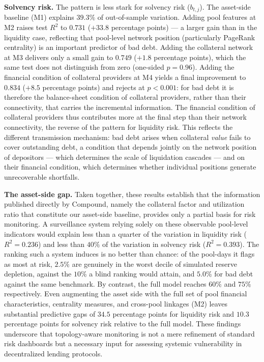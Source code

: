 \documentclass[a4paper,UKenglish,cleveref, autoref, thm-restate]{informs3}
\newcommand{\rev}[1]{{\color{purple}#1}}
\DeclareRobustCommand{\latestrev}[1]{{\color{red}\hypersetup{linkcolor=red,citecolor=red,urlcolor=red}#1}}
\newcommand{\boldpara}[1]{\noindent\textbf{#1}\quad}
\begin{document}
\medskip

\boldpara{Solvency risk.}
The pattern is less stark for solvency risk ($b_{t,j}$). The
asset-side baseline (M1) explains $39.3\%$ of out-of-sample
variation. Adding pool features at M2 raises test $R^2$ to
$0.731$ ($+33.8$ percentage points) --- a larger gain than in
the liquidity case, reflecting that pool-level network position
(particularly PageRank centrality) is an important predictor of
bad debt. Adding the collateral network at M3 delivers only a
small gain to $0.749$ ($+1.8$ percentage points), \rev{which the
same test does not distinguish from zero (one-sided $p = 0.96$).}
Adding the financial condition of collateral providers at M4
yields a final improvement to $0.834$ ($+8.5$ percentage points)
\rev{and rejects at $p < 0.001$: for bad debt it is therefore the
balance-sheet condition of collateral providers, rather than their
connectivity, that carries the incremental information}.
The financial condition of collateral providers thus contributes
more at the final step than their network connectivity, the
reverse of the pattern for liquidity risk. This reflects the
different transmission mechanism: bad debt arises when collateral
\emph{value} fails to cover outstanding debt, a condition that
depends jointly on the network position of depositors --- which
determines the scale of liquidation cascades --- and on their
financial condition, which determines whether individual positions
generate unrecoverable shortfalls.

\medskip
\boldpara{The asset-side gap.}
Taken together, these results establish that the information
published directly by Compound, namely the collateral factor
and utilization ratio that constitute our asset-side baseline,
provides only a partial basis for risk monitoring. A surveillance
system relying solely on these observable pool-level indicators
would explain less than a quarter of the variation in liquidity
risk ($R^2 = 0.236$) and less than $40\%$ of the variation in
solvency risk ($R^2 = 0.393$). \rev{The ranking such a system
induces is no better than chance: of the pool-days it flags as
most at risk, $2.5\%$ are genuinely in the worst decile of
\latestrev{simulated} reserve depletion, against the $10\%$ a blind ranking
would attain, and $5.0\%$ for bad debt against the same benchmark.
By contrast, the full model reaches $60\%$ and $75\%$ respectively.} Even
augmenting the asset side
with the full set of pool financial characteristics, centrality
measures, and cross-pool linkages (M2) leaves substantial
predictive gaps of $34.5$ percentage points for liquidity risk
and $10.3$ percentage points for solvency risk relative to the
full model. These findings underscore that topology-aware monitoring is not a mere refinement of standard risk dashboards but a necessary input for assessing systemic vulnerability in decentralized lending protocols.
\end{document}
